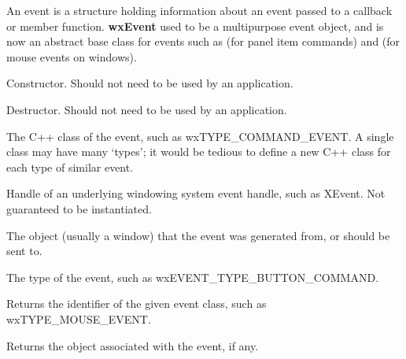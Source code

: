 An event is a structure holding information about an event passed to a
callback or member function. {\bf wxEvent} used to be a multipurpose
event object, and is now an abstract base class for events such
as  (for panel item commands)
and  (for mouse events on windows).



Constructor. Should not need to be used by an application.



Destructor. Should not need to be used by an application.



The C++ class of the event, such as wxTYPE\_COMMAND\_EVENT.
A single class may have many `types'; it would be tedious to define
a new C++ class for each type of similar event.



Handle of an underlying windowing system event handle, such as
XEvent. Not guaranteed to be instantiated.



The object (usually a window) that the event was generated from,
or should be sent to.



The type of the event, such as wxEVENT\_TYPE\_BUTTON\_COMMAND.



Returns the identifier of the given event class,
such as wxTYPE\_MOUSE\_EVENT.



Returns the object associated with the
event, if any.

